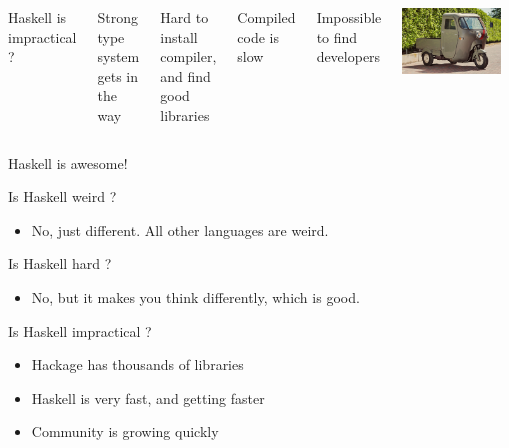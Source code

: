 \documentclass[xcolor={table}]{beamer}
\begin{document}
\begin{frame}{}{}

    \begin{columns}
    {\Large Haskell is impractical ? }

    \pause\bigskip
    Strong type system gets in the way

    \pause\bigskip
    Hard to install compiler, and find good libraries

    \pause\bigskip
    Compiled code is slow

    \pause\bigskip
    Impossible to find developers

    \pause

    \includegraphics[width=0.9\textwidth]{images/ducati-muletto.jpg}
        
    \end{columns}

\end{frame}

\begin{frame}{}{}

    {\Large Haskell is awesome! }

    \pause
    Is Haskell weird ?\pause
    \begin{itemize}
        \item No, just different. All other languages are weird.
    \end{itemize}

    \pause
    Is Haskell hard ?\pause 
    \begin{itemize}
        \item No, but it makes you think differently, which is good.
    \end{itemize}

    \pause
    Is Haskell impractical ?\pause 
    \begin{itemize}
        \item Hackage has thousands of libraries
        \item Haskell is very fast, and getting faster
        \item Community is growing quickly
    \end{itemize}

\end{frame}
\end{document}
